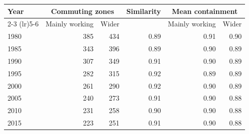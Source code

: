 \begin{tabular}{lrrrrr}
\toprule
Year & \multicolumn{2}{c}{Commuting zones} & Similarity & \multicolumn{2}{c}{Mean containment} \\\cmidrule(lr){2-3} \cmidrule(lr){5-6} & Mainly working & Wider & & Mainly working & Wider \\
\midrule
1980 & 385 & 434 & 0.89 & 0.91 & 0.90 \\
1985 & 343 & 396 & 0.89 & 0.90 & 0.89 \\
1990 & 307 & 349 & 0.91 & 0.90 & 0.89 \\
1995 & 282 & 315 & 0.92 & 0.89 & 0.89 \\
2000 & 261 & 290 & 0.92 & 0.90 & 0.89 \\
2005 & 240 & 273 & 0.91 & 0.90 & 0.88 \\
2010 & 231 & 258 & 0.90 & 0.90 & 0.88 \\
2015 & 223 & 251 & 0.91 & 0.90 & 0.88 \\
\bottomrule
\end{tabular}
